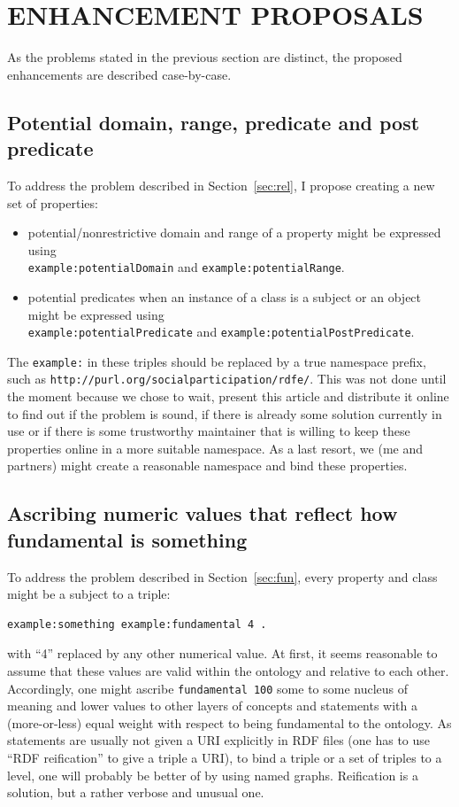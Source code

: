 \documentclass[12pt,fleqn]{article}
\begin{document}
\section{ENHANCEMENT PROPOSALS}\label{sec:prop}
As the problems stated in the previous section are distinct,
the proposed enhancements are described case-by-case.

\subsection{Potential domain, range, predicate and post predicate}
To address the problem described in Section~\ref{sec:rel},
I propose creating a new set of properties:
\begin{itemize}
	\item potential/nonrestrictive domain and range of a property might be expressed using\\
		\texttt{example:potentialDomain} and \texttt{example:potentialRange}.
	\item potential predicates when an instance of a class is a subject or an object might
		be expressed using\\
		\texttt{example:potentialPredicate} and \texttt{example:potentialPostPredicate}.
\end{itemize}

The \texttt{example:} in these triples should be replaced by a true namespace prefix, such
as \texttt{http://purl.org/socialparticipation/rdfe/}.
This was not done until the moment because we chose to wait,
present this article and distribute it online to find out if the problem is sound, if there is already some
solution currently in use or if there is some trustworthy maintainer that is willing
to keep these properties online in a more suitable namespace.
As a last resort, we (me and partners) might create a reasonable namespace
and bind these properties.

\subsection{Ascribing numeric values that reflect how fundamental is something}\label{sec:props}
To address the problem described in Section~\ref{sec:fun},
every property and class might be a subject to a triple:
\begin{Verbatim}[fontsize=\footnotesize]
	example:something example:fundamental 4 .
\end{Verbatim}
\noindent with ``4'' replaced by any other numerical value.
At first, it seems reasonable to assume that these values are
valid within the ontology and relative to each other.
Accordingly, one might ascribe \texttt{fundamental 100}
some to some nucleus of meaning and lower values to other layers of
concepts and statements with a (more-or-less) equal weight with respect
to being fundamental to the ontology.
As statements are usually not given a URI explicitly
in RDF files (one has to use ``RDF reification'' to give a triple a URI),
to bind a triple or a set of triples to a level,
one will probably be better of by using named graphs.
Reification is a solution, but a rather verbose and unusual one.
\end{document}
